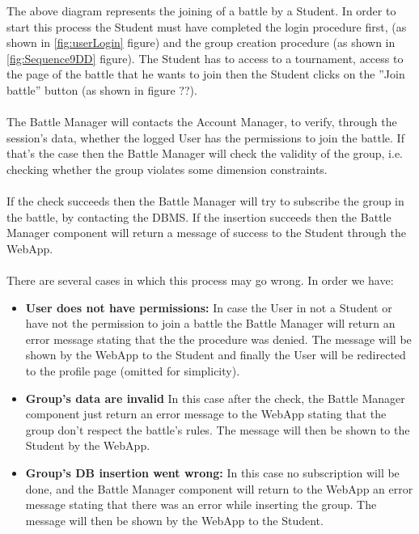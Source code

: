 \documentclass{article}
\begin{document}
{        The above diagram represents the joining of a battle by a Student. 
        In order to start this process the Student must have 
        completed the login procedure first, (as shown in \ref{fig:userLogin} figure) and the
        group creation procedure (as shown in \ref{fig:Sequence9DD} figure). 
        The Student has to access to a tournament, access 
        to the page of the battle that he wants to join then the Student
        clicks on the ”Join battle” button (as shown in figure ??).
        \\ \\
        The Battle Manager will contacts the Account Manager, to verify, 
        through the session’s data, whether the logged User has the 
        permissions to join the battle. If that’s the case then the Battle 
        Manager will check the validity of the group, i.e. 
        checking whether the group violates some dimension constraints.
        \\ \\
        If the check succeeds then the Battle Manager will try to subscribe 
        the group in the battle, by contacting the DBMS.
        If the insertion succeeds then the Battle Manager component will 
        return a message of success to the Student through the WebApp.
        \\ \\
        There are several cases in which this process may go wrong. In order we have:
        \begin{itemize}
            \item \textbf{User does not have permissions:} In case the User in not a Student 
            or have not the permission to join a battle the Battle Manager will return an 
            error message stating that the the procedure was denied. The message will be shown 
            by the WebApp to the Student and finally the User will be
            redirected to the profile page (omitted for simplicity).
            \item \textbf{Group's data are invalid} In this case after the check, the Battle
            Manager component just return an error message to the WebApp stating that
            the group don't respect the battle's rules. The message will then be shown to the
            Student by the WebApp.
            \item \textbf{Group's DB insertion went wrong:} In this case no subscription will
            be done, and the Battle Manager component will return to the WebApp 
            an error message stating that there was an error while inserting the group. 
            The message will then be shown by the WebApp to the Student.
        \end{itemize}


}
\end{document}
